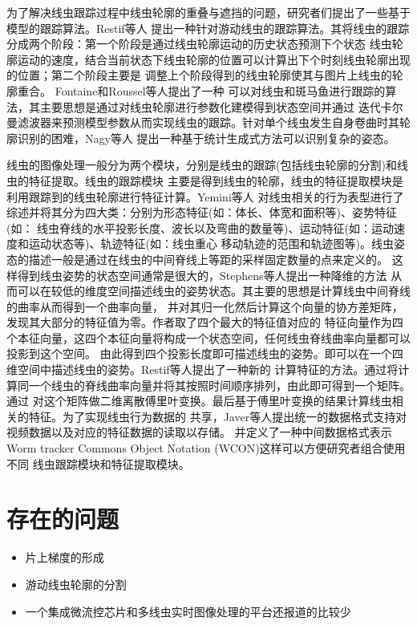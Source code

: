 	为了解决线虫跟踪过程中线虫轮廓的重叠与遮挡的问题，研究者们提出了一些基于模型的跟踪算法。Restif等人\cite{restif2008tracking}
	提出一种针对游动线虫的跟踪算法。其将线虫的跟踪分成两个阶段：第一个阶段是通过线虫轮廓运动的历史状态预测下个状态
	线虫轮廓运动的速度，结合当前状态下线虫轮廓的位置可以计算出下个时刻线虫轮廓出现的位置；第二个阶段主要是
	调整上个阶段得到的线虫轮廓使其与图片上线虫的轮廓重合。 Fontaine和Roussel等人\cite{fontaine2007model,roussel2014robust}提出了一种
	可以对线虫和斑马鱼进行跟踪的算法，其主要思想是通过对线虫轮廓进行参数化建模得到状态空间并通过
	迭代卡尔曼滤波器来预测模型参数从而实现线虫的跟踪。针对单个线虫发生自身卷曲时其轮廓识别的困难，Nagy等人
	\cite{nagy2015generative}提出一种基于统计生成式方法可以识别复杂的姿态。
	
	线虫的图像处理一般分为两个模块，分别是线虫的跟踪(包括线虫轮廓的分割)和线虫的特征提取。线虫的跟踪模块
	主要是得到线虫的轮廓，线虫的特征提取模块是利用跟踪到的线虫轮廓进行特征计算。Yemini等人\cite{yemini2013database}
	对线虫相关的行为表型进行了综述并将其分为四大类：分别为形态特征(如：体长、体宽和面积等)、姿势特征(如：
	线虫脊线的水平投影长度、波长以及弯曲的数量等)、运动特征(如：运动速度和运动状态等)、轨迹特征(如：线虫重心
	移动轨迹的范围和轨迹图等)。线虫姿态的描述一般是通过在线虫的中间脊线上等距的采样固定数量的点来定义的。
	这样得到线虫姿势的状态空间通常是很大的，Stephens等人\cite{Stephens2008Dimensionality}提出一种降维的方法
	从而可以在较低的维度空间描述线虫的姿势状态。其主要的思想是计算线虫中间脊线的曲率从而得到一个曲率向量，
	并对其归一化然后计算这个向量的协方差矩阵，发现其大部分的特征值为零。作者取了四个最大的特征值对应的
	特征向量作为四个本征向量，这四个本征向量将构成一个状态空间，任何线虫脊线曲率向量都可以投影到这个空间。
	由此得到四个投影长度即可描述线虫的姿势。即可以在一个四维空间中描述线虫的姿势。Restif等人\cite{Restif2014CeleST}提出了一种新的
	计算特征的方法。通过将计算同一个线虫的脊线曲率向量并将其按照时间顺序排列，由此即可得到一个矩阵。通过
	对这个矩阵做二维离散傅里叶变换。最后基于傅里叶变换的结果计算线虫相关的特征。为了实现线虫行为数据的
	共享，Javer等人\cite{Javer2018An}提出统一的数据格式支持对视频数据以及对应的特征数据的读取以存储。
	并定义了一种中间数据格式表示Worm tracker Commons Object Notation (WCON)这样可以方便研究者组合使用不同
	线虫跟踪模块和特征提取模块。
\section{存在的问题}
\label{sec:intro:analog}
	\begin{itemize}
	  \item 片上梯度的形成
	  \item 游动线虫轮廓的分割
	  \item 一个集成微流控芯片和多线虫实时图像处理的平台还报道的比较少
	\end{itemize}
